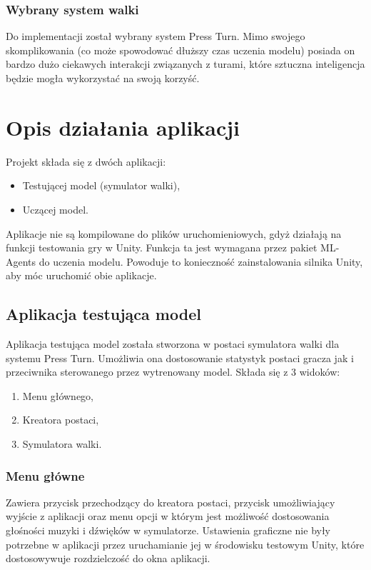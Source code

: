 \documentclass{SGGW-thesis}
\begin{document}
\subsection*{Wybrany system walki}
Do implementacji został wybrany system Press Turn. Mimo swojego skomplikowania (co może spowodować dłuższy czas uczenia modelu) posiada on bardzo dużo ciekawych interakcji związanych z turami, które sztuczna inteligencja będzie mogła wykorzystać na swoją korzyść.

\chapter{Opis działania aplikacji}
Projekt składa się z dwóch aplikacji:
\begin{itemize}
  \item Testującej model (symulator walki),
  \item Uczącej model.
\end{itemize}
Aplikacje nie są kompilowane do plików uruchomieniowych, gdyż działają na funkcji testowania gry w Unity.
Funkcja ta jest wymagana przez pakiet ML-Agents do uczenia modelu.
Powoduje to konieczność zainstalowania silnika Unity, aby móc uruchomić obie aplikacje.
\section{Aplikacja testująca model}
Aplikacja testująca model została stworzona w postaci symulatora walki dla systemu Press Turn. Umożliwia ona dostosowanie statystyk postaci gracza jak i przeciwnika sterowanego przez wytrenowany model.
Składa się z 3 widoków:
\begin{enumerate}
  \item Menu głównego,
  \item Kreatora postaci,
  \item Symulatora walki.
\end{enumerate}

\subsection{Menu główne}
Zawiera przycisk przechodzący do kreatora postaci, przycisk umożliwiający wyjście z aplikacji oraz menu opcji w którym jest możliwość dostosowania głośności muzyki i dźwięków w symulatorze.
Ustawienia graficzne nie były potrzebne w aplikacji przez uruchamianie jej w środowisku testowym Unity, które dostosowywuje rozdzielczość do okna aplikacji.
\end{document}

